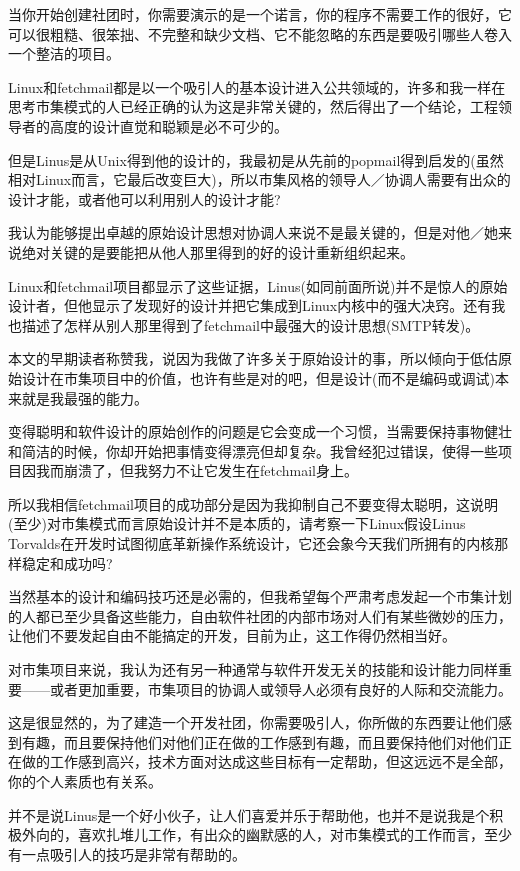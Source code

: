 \documentclass[a4paper,12pt,UTF8,twoside]{ctexbook}
\begin{document}
当你开始创建社团时，你需要演示的是一个诺言，你的程序不需要工作的很好，它可以很粗糙、很笨拙、不完整和缺少文档、它不能忽略的东西是要吸引哪些人卷入一个整洁的项目。


Linux和fetchmail都是以一个吸引人的基本设计进入公共领域的，许多和我一样在思考市集模式的人已经正确的认为这是非常关键的，然后得出了一个结论，工程领导者的高度的设计直觉和聪颖是必不可少的。


但是Linus是从Unix得到他的设计的，我最初是从先前的popmail得到启发的(虽然相对Linux而言，它最后改变巨大)，所以市集风格的领导人／协调人需要有出众的设计才能，或者他可以利用别人的设计才能?


我认为能够提出卓越的原始设计思想对协调人来说不是最关键的，但是对他／她来说绝对关键的是要能把从他人那里得到的好的设计重新组织起来。


Linux和fetchmail项目都显示了这些证据，Linus(如同前面所说)并不是惊人的原始设计者，但他显示了发现好的设计并把它集成到Linux内核中的强大决窍。还有我也描述了怎样从别人那里得到了fetchmail中最强大的设计思想(SMTP转发)。


本文的早期读者称赞我，说因为我做了许多关于原始设计的事，所以倾向于低估原始设计在市集项目中的价值，也许有些是对的吧，但是设计(而不是编码或调试)本来就是我最强的能力。


变得聪明和软件设计的原始创作的问题是它会变成一个习惯，当需要保持事物健壮和简洁的时候，你却开始把事情变得漂亮但却复杂。我曾经犯过错误，使得一些项目因我而崩溃了，但我努力不让它发生在fetchmail身上。


所以我相信fetchmail项目的成功部分是因为我抑制自己不要变得太聪明，这说明(至少)对市集模式而言原始设计并不是本质的，请考察一下Linux假设Linus Torvalds在开发时试图彻底革新操作系统设计，它还会象今天我们所拥有的内核那样稳定和成功吗?


当然基本的设计和编码技巧还是必需的，但我希望每个严肃考虑发起一个市集计划的人都已至少具备这些能力，自由软件社团的内部市场对人们有某些微妙的压力，让他们不要发起自由不能搞定的开发，目前为止，这工作得仍然相当好。


对市集项目来说，我认为还有另一种通常与软件开发无关的技能和设计能力同样重要——或者更加重要，市集项目的协调人或领导人必须有良好的人际和交流能力。


这是很显然的，为了建造一个开发社团，你需要吸引人，你所做的东西要让他们感到有趣，而且要保持他们对他们正在做的工作感到有趣，而且要保持他们对他们正在做的工作感到高兴，技术方面对达成这些目标有一定帮助，但这远远不是全部，你的个人素质也有关系。


并不是说Linus是一个好小伙子，让人们喜爱并乐于帮助他，也并不是说我是个积极外向的，喜欢扎堆儿工作，有出众的幽默感的人，对市集模式的工作而言，至少有一点吸引人的技巧是非常有帮助的。
\end{document}
